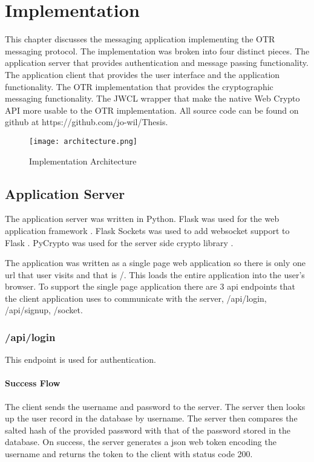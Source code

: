 \chapter{Implementation}


This chapter discusses the messaging application implementing the OTR messaging protocol. The implementation was broken into four distinct pieces. The application server that provides authentication and message passing functionality. The application client that provides the user interface and the application functionality. The OTR implementation that provides the cryptographic messaging functionality. The JWCL wrapper that make the native Web Crypto API more usable to the OTR implementation. All source code can be found on github at https://github.com/jo-wil/Thesis.

\begin{figure}[ht]
    \centering
    \texttt{[image: architecture.png]}
    \caption{Implementation Architecture}
    \label{fig:architecture}
\end{figure}


\section{Application Server}


The application server was written in Python. Flask was used for the web application framework \cite{flask}. Flask Sockets was used to add websocket support to Flask \cite{flask-sockets}. PyCrypto was used for the server side crypto library \cite{pycrypto}.


The application was written as a single page web application so there is only one url that user visits and that is /. This loads the entire application into the user's browser. To support the single page application there are 3 api endpoints that the client application uses to communicate with the server, /api/login, /api/signup, /socket.


\subsection{/api/login}


This endpoint is used for authentication. 


\subsubsection{Success Flow}


The client sends the username and password to the server. The server then looks up the user record in the database by username. The server then compares the salted hash of the provided password with that of the password stored in the database. On success, the server generates a json web token encoding the username and returns the token to the client with status code 200.


